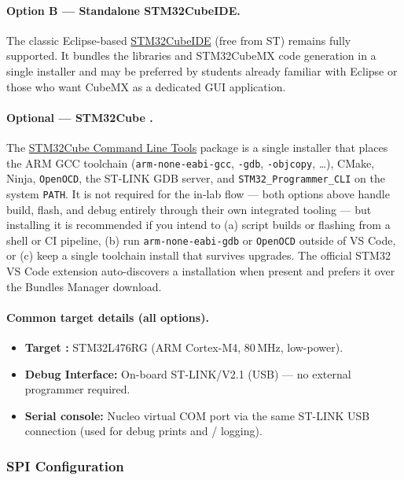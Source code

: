 \documentclass[11pt,letterpaper]{article}
\begin{document}
	\paragraph{Option B --- Standalone STM32CubeIDE.}
	The classic Eclipse-based \href{https://www.st.com/en/development-tools/stm32cubeide.html}{STM32CubeIDE} (free from ST) remains fully supported. It bundles the \HAL{} libraries and STM32CubeMX code generation in a single installer and may be preferred by students already familiar with Eclipse or those who want CubeMX as a dedicated GUI application.

	\paragraph{Optional --- STM32Cube \CLT{}.}
	The \href{https://www.st.com/en/development-tools/stm32cubeclt.html}{STM32Cube Command Line Tools} package is a single installer that places the ARM GCC toolchain (\texttt{arm-none-eabi-gcc}, \texttt{-gdb}, \texttt{-objcopy}, \ldots), CMake, Ninja, \texttt{OpenOCD}, the ST-LINK GDB server, and \texttt{STM32\_Programmer\_CLI} on the system \texttt{PATH}. It is not required for the in-lab flow --- both options above handle build, flash, and debug entirely through their own integrated tooling --- but installing it is recommended if you intend to (a) script builds or flashing from a shell or CI pipeline, (b) run \texttt{arm-none-eabi-gdb} or \texttt{OpenOCD} outside of VS Code, or (c) keep a single toolchain install that survives \IDE{} upgrades. The official STM32 VS Code extension auto-discovers a \CLT{} installation when present and prefers it over the Bundles Manager download.

	\paragraph{Common target details (all options).}
	\begin{itemize}[leftmargin=2em]
		\item \textbf{Target \MCU{}:} STM32L476RG (ARM Cortex-M4, 80\,MHz, low-power).
		\item \textbf{Debug Interface:} On-board ST-LINK/V2.1 (USB) --- no external programmer required.
		\item \textbf{Serial console:} Nucleo virtual COM port via the same ST-LINK USB connection (used for debug prints and \RSSI{}/\SNR{} logging).
	\end{itemize}
	
	\subsubsection{SPI Configuration}
	
\end{document}

